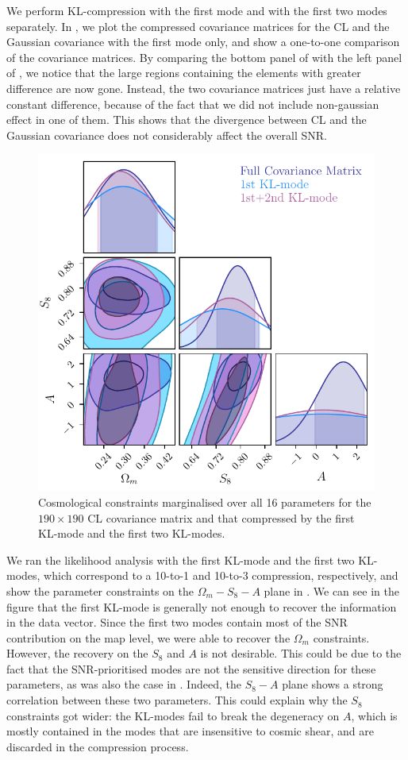 \documentclass[twocolumn]{\docclass}
\begin{document}
	We perform KL-compression with the first mode and with the first two modes separately. In , we plot the compressed covariance matrices for the CL and the Gaussian covariance with the first mode only, and show a one-to-one comparison of the covariance matrices. By comparing the bottom panel of   with the left panel of , we notice that the large regions containing the elements with greater difference are now gone. Instead, the two covariance matrices just have a relative constant difference, because of the fact that we did not include non-gaussian effect in one of them. This shows that the divergence between CL and the Gaussian covariance does not considerably affect the overall SNR. 
	
	\begin{figure}
		\includegraphics[width=0.8\columnwidth]{om_s8_A_full_1st_2nd.pdf}
		\caption{Cosmological constraints marginalised over all 16 parameters for the  $190 \times 190$ CL covariance matrix and that compressed by the first KL-mode and the first two KL-modes.\label{fig:kl-constraints}}
	\end{figure}
	We ran the likelihood analysis with the first KL-mode and the first two KL-modes, which correspond to a 10-to-1 and 10-to-3 compression, respectively, and show the parameter constraints on the $\Omega_m - S_8 - A$ plane in . We can see in the figure that the first KL-mode is generally not enough to recover the information in the data vector. Since the first two modes contain most of the SNR contribution on the map level, we were able to recover the $\Omega_m$ constraints. However, the recovery on the $S_8$ and $A$ is not desirable. This could be due to the fact that the SNR-prioritised modes are not the sensitive direction for these parameters, as was also the case in . Indeed, the $S_8 - A$ plane shows a strong correlation between these two parameters. This could explain why the $S_8$ constraints got wider: the KL-modes fail to break the degeneracy on $A$, which is mostly contained in the modes that are insensitive to cosmic shear, and are discarded in the compression process.
	
\end{document}

